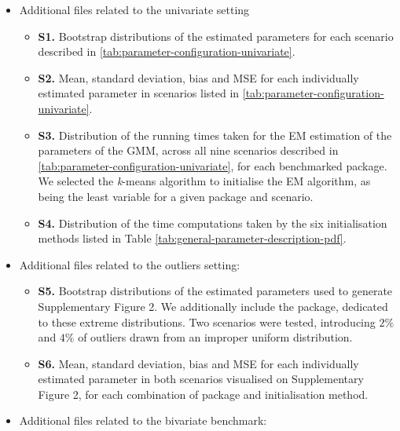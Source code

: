 \begin{itemize}
\item
  Additional files related to the univariate setting

  \begin{itemize}
  \tightlist
  \item
    \textbf{S1.} Bootstrap distributions of the estimated parameters for each
    scenario described in \ref{tab:parameter-configuration-univariate}.
  \item
    \textbf{S2.} Mean, standard deviation, bias and MSE for each individually
    estimated parameter in scenarios listed in \ref{tab:parameter-configuration-univariate}.
  \item
    \textbf{S3.} Distribution of the running times taken for the EM estimation of the parameters of the GMM, across all nine scenarios described in \ref{tab:parameter-configuration-univariate}, for each benchmarked package. We selected the \emph{k}-means algorithm to initialise the EM algorithm, as being the least variable for a given package and scenario.
  \item
    \textbf{S4.} Distribution of the time computations taken by the six initialisation methods listed in Table \ref{tab:general-parameter-description-pdf}.
  \end{itemize}
\item
  Additional files related to the outliers setting:

  \begin{itemize}
  \tightlist
  \item
    \textbf{S5.} Bootstrap distributions of the estimated parameters used to
    generate Supplementary Figure 2. We additionally include the  package, dedicated to these extreme distributions. Two scenarios were tested, introducing \(2 \%\) and \(4 \%\) of outliers drawn from an improper uniform distribution.
  \item
    \textbf{S6.} Mean, standard deviation, bias and MSE for each individually
    estimated parameter in both scenarios visualised on Supplementary Figure 2, for each combination of package and
    initialisation method.
  \end{itemize}
\item
  Additional files related to the bivariate benchmark:


\end{itemize}
